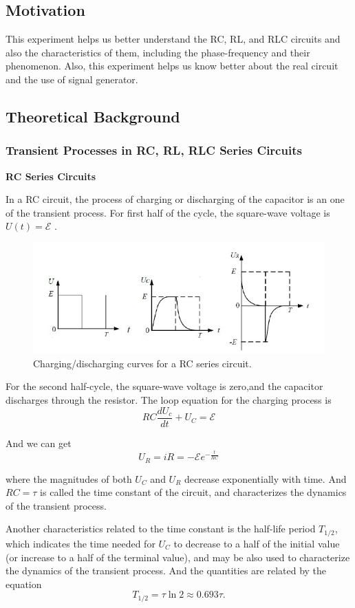 \documentclass[12pt,a4paper]{article}
\begin{document}
\subsection{Motivation}
\qquad This experiment helps us better understand the RC, RL, and RLC circuits and also the characteristics of them, including the phase-frequency and their phenomenon. Also, this experiment helps us know better about the real circuit and the use of signal generator.
\subsection{Theoretical Background}

\subsubsection{Transient Processes in RC, RL, RLC Series Circuits}

\quad \textbf{RC Series Circuits}\par
In a RC circuit, the process of charging or discharging of the capacitor is an one
of the transient process. For first half of the cycle, the square-wave voltage is $U(t) = \mathcal{E}$ . 
\begin{figure}[h]
	\centering
	\includegraphics[width=14cm]{1}
	\caption{Charging/discharging curves for a RC series circuit.}
	\label{fig:front}
\end{figure}
\par For the second half-cycle, the square-wave voltage is zero,and the capacitor discharges through the resistor. The loop equation for the charging process is
$$RC\frac{dU_c}{dt}+U_C=\mathcal{E}$$
\par And we can get
$$U_R=iR=-\mathcal{E} e^{-\frac{t}{RC}}$$
\par where the magnitudes of both $U_C$ and $U_R$ decrease exponentially with time. And $RC = \tau$ is called the time constant of the circuit, and characterizes the
dynamics of the transient process. \par Another characteristics related to the time
constant is the half-life period $T_{1/2}$, which indicates the time needed for $U_C$ to decrease to a half of the initial value (or
increase to a half of the terminal value), and may be also used to characterize the dynamics of the transient process. And the quantities are related by the equation $$T_{1/2}=\tau \ln{2}\approx 0.693\tau.$$
\end{document}
